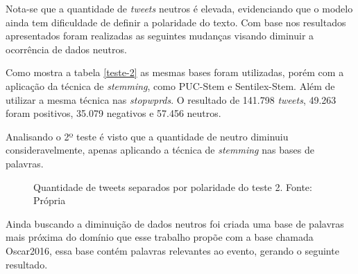 Nota-se que a quantidade de \textit{tweets} neutros é elevada, evidenciando que o modelo ainda tem dificuldade de definir a polaridade do texto. Com base nos resultados apresentados foram realizadas as seguintes mudanças visando diminuir a ocorrência de dados neutros.
 
Como mostra a tabela \ref{teste-2} as mesmas bases foram utilizadas, porém com a aplicação da técnica de \textit{stemming}, como  PUC-Stem e Sentilex-Stem. Além de utilizar a mesma técnica nas  \textit{stopwprds}. O resultado de 141.798 \textit{tweets}, 49.263 foram positivos, 35.079 negativos e 57.456 neutros.
\begin{table}[]
	\caption{2º teste}
	\label{teste-2}
\end{table}

Analisando o 2º teste é visto que a quantidade de neutro diminuiu consideravelmente, apenas aplicando a técnica de \textit{stemming} nas bases de palavras.
\begin{figure}[!h]
	\centering{}
	\caption{Quantidade de tweets separados por polaridade do teste 2. Fonte: Própria}
	\label{teste-graf-2}
\end{figure}

Ainda buscando a diminuição de dados neutros foi criada uma base de palavras mais próxima do domínio que esse trabalho propõe com a base chamada Oscar2016, essa base contém palavras relevantes ao evento, gerando o seguinte resultado.

